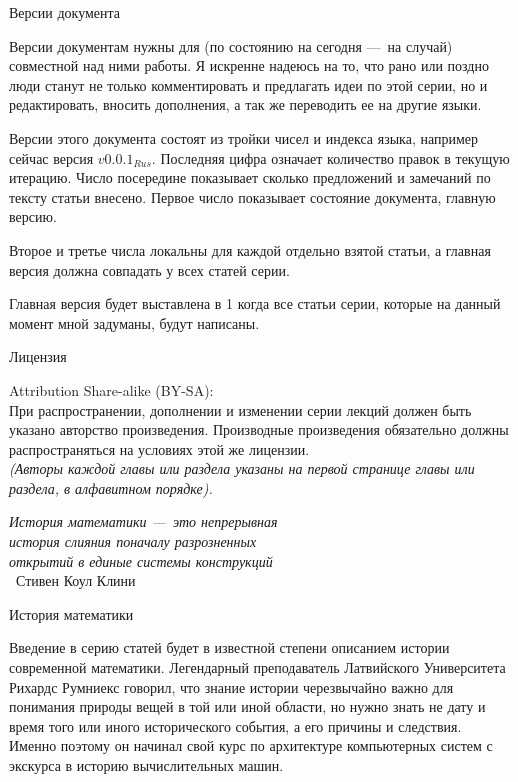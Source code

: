 \documentclass[math.tex]{subfiles}
\begin{document}
	\vspace{1cm}
	\LARGE{Версии документа}\\
	\normalsize
	
	Версии документам нужны для (по состоянию на сегодня —\ на случай) со\-вместной над ними работы.
Я искренне надеюсь на то, что рано или поздно люди станут не только комментировать и предлагать идеи по этой серии, но и редак\-тировать, вносить дополнения, а так же переводить ее на другие языки.
	
	Версии этого документа состоят из тройки чисел и индекса языка, например сейчас версия $v0.0.1_{Rus}$. 
Последняя цифра означает количество правок в текущую итерацию. 
Число посередине показывает сколько предложений и замечаний по тексту статьи внесено. 
Первое число показывает состояние документа, главную версию.

	Второе и третье числа локальны для каждой отдельно взятой статьи, а главная версия должна совпадать у всех статей серии.

	Главная версия будет выставлена в 1 когда все статьи серии, которые на данный момент мной задуманы, будут написаны.
	
	\vspace{1cm}
	\LARGE{Лицензия}\\
	\normalsize

	Attribution Share-alike (BY-SA):\\

	При распространении, дополнении и изменении серии лекций должен быть указано авторство про\-из\-ведения.
Производные произведения обязательно должны распространяться на условиях этой же лицензии.\\
	
	\emph{(Авторы каждой главы или раздела указаны на первой странице главы или раздела, в алфавитном порядке).}
	
	\vspace{1cm}
	\newpage
	\begin{flushright}
		\emph{История математики —\ это непрерывная\\ история слияния поначалу разрозненных\\ открытий в единые системы конструкций}\\
		~Стивен Коул Клини
	\end{flushright}
	\LARGE{История математики}
	\newline
	\normalsize
	
	Введение в серию статей будет в известной степени описанием истории сов\-ременной математики.
Легендарный преподаватель Латвийского Университета Рихардс Румниекс говорил, что знание истории черезвычайно важно для пони\-мания природы вещей в той или иной области, но нужно знать не дату и время того или иного исторического события, а его причины и следствия.
Именно поэтому он начинал свой курс по архитектуре компьютерных систем с экскурса в историю вычислительных машин.
\end{document}

